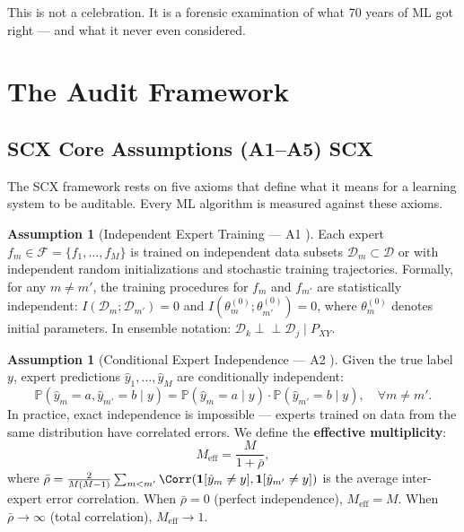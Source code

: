 \documentclass[12pt,a4paper]{article}
\theoremstyle{definition}
\newtheorem{assumption}[theorem]{Assumption}
\newcommand{\SCX}{\textsc{SCX}}
\newcommand{\Pbb}{\mathbb{P}}
\newcommand{\cD}{\mathcal{D}}
\newcommand{\cF}{\mathcal{F}}
\newcommand{\ind}[1]{\mathbf{1}[#1]}
\newcommand{\condind}{\perp\!\!\!\perp}
\begin{document}
This is not a celebration. It is a forensic examination of what 70 years of ML got right — and what it never even considered.

\section{The Audit Framework }
\label{sec:framework}

\subsection{SCX Core Assumptions (A1--A5) SCX}

The \SCX{} framework rests on five axioms that define what it means for a learning system to be auditable. Every ML algorithm is measured against these axioms.

\begin{assumption}[Independent Expert Training — A1 ]
\label{asm:A1}
Each expert $f_m \in \cF = \{f_1, \ldots, f_M\}$ is trained on independent data subsets $\cD_m \subset \cD$ or with independent random initializations and stochastic training trajectories. Formally, for any $m \neq m'$, the training procedures for $f_m$ and $f_{m'}$ are statistically independent: $I(\cD_m; \cD_{m'}) = 0$ and $I(\theta_m^{(0)}; \theta_{m'}^{(0)}) = 0$, where $\theta_m^{(0)}$ denotes initial parameters. In ensemble notation: $\cD_k \condind \cD_j \mid P_{XY}$.
\end{assumption}

\begin{assumption}[Conditional Expert Independence — A2 ]
\label{asm:A2}
Given the true label $y$, expert predictions $\hat{y}_1, \ldots, \hat{y}_M$ are conditionally independent:
\[
\Pbb(\hat{y}_m = a, \hat{y}_{m'} = b \mid y) = \Pbb(\hat{y}_m = a \mid y) \cdot \Pbb(\hat{y}_{m'} = b \mid y), \quad \forall m \neq m'.
\]
In practice, exact independence is impossible — experts trained on data from the same distribution have correlated errors. We define the \textbf{effective multiplicity}:
\begin{equation}\label{eq:Meff}
    M_{\text{eff}} = \frac{M}{1 + \bar{\rho}},
\end{equation}
where $\bar{\rho} = \frac{2}{M(M-1)}\sum_{m<m'}\Corr(\ind{\hat{y}_m \neq y}, \ind{\hat{y}_{m'} \neq y})$ is the average inter-expert error correlation. When $\bar{\rho} = 0$ (perfect independence), $M_{\text{eff}} = M$. When $\bar{\rho} \to \infty$ (total correlation), $M_{\text{eff}} \to 1$.
\end{assumption}
\end{document}
